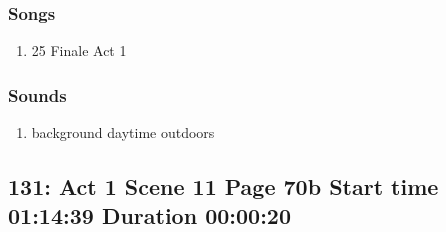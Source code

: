 \subsubsection{Songs}
\begin{enumerate}
\item 25 Finale Act 1
\end{enumerate}\subsubsection{Sounds}
\begin{enumerate}
\item background daytime outdoors
\end{enumerate}
\subsection{131: Act 1 Scene 11 Page 70b Start time 01:14:39 Duration 00:00:20}

